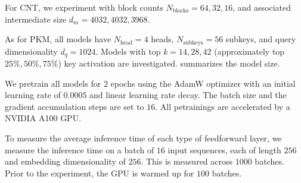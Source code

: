 For CNT, we experiment with block counts $N_\text{blocks}=64,32,16$, and associated intermediate size $d_m = 4032, 4032, 3968$.

As for PKM, all models have $N_\text{head}=4$ heads, $N_\text{subkeys}=56$ subkeys, and query dimensionality $d_q=1024$. Models with top $k=14,28,42$ (approximately top $25\%,50\%,75\%$) key activation are investigated.  summarizes the model size. 

We pretrain all models for $2$ epochs using the AdamW optimizer with an initial learning rate of $0.0005$ and linear learning rate decay. The batch size and the gradient accumulation steps are set to $16$. All petrainings are accelerated by a NVIDIA A100 GPU.

To measure the average inference time of each type of feedforward layer, we measure the inference time on a batch of $16$ input sequences, each of length $256$ and embedding dimensionality of $256$. This is measured across $1000$ batches. Prior to the experiment, the GPU is warmed up for $100$ batches.


